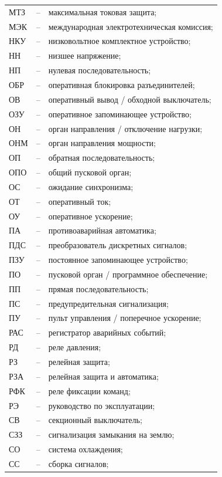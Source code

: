 \begin{longtable}{>{\raggedright\arraybackslash}m{2cm}>{\raggedright\arraybackslash}m{0.5cm}>{\raggedright\arraybackslash}m{20cm}}
МТЗ & -- & максимальная токовая защита; \\
МЭК & -- & международная электротехническая комиссия; \\
НКУ & -- & низковольтное комплектное устройство; \\
НН & -- & низшее напряжение; \\
НП & -- & нулевая последовательность; \\
ОБР & -- & оперативная блокировка разъединителей; \\
ОВ & -- & оперативный вывод / обходной выключатель; \\
ОЗУ & -- & оперативное запоминающее устройство; \\
ОН & -- & орган направления / отключение нагрузки; \\
ОНМ & -- & орган направления мощности; \\
ОП & -- & обратная последовательность; \\
ОПО & -- & общий пусковой орган; \\
ОС & -- & ожидание синхронизма; \\
ОТ & -- & оперативный ток; \\
ОУ & -- & оперативное ускорение; \\
ПА & -- & противоаварийная автоматика; \\
ПДС & -- & преобразователь дискретных сигналов; \\
ПЗУ & -- & постоянное запоминающее устройство; \\
ПО & -- & пусковой орган / программное обеспечение; \\
ПП & -- & прямая последовательность; \\
ПС & -- & предупредительная сигнализация; \\
ПУ & -- & пульт управления / поперечное ускорение; \\
РАС & -- & регистратор аварийных событий; \\
РД & -- & реле давления; \\
РЗ & -- & релейная защита; \\
РЗА & -- & релейная защита и автоматика; \\
РФК & -- & реле фиксации команд; \\
РЭ & -- & руководство по эксплуатации; \\
СВ & -- & секционный выключатель; \\
СЗЗ & -- & сигнализация замыкания на землю; \\
СО & -- & система охлаждения; \\
СС & -- & сборка сигналов; \\

\end{longtable}
